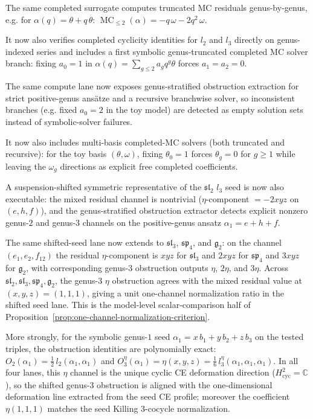   The same completed surrogate computes truncated MC residuals
  genus-by-genus, e.g. for $\alpha(q)=\theta+q\,\theta$:
  $\operatorname{MC}_{\le 2}(\alpha)=-q\,\omega-2q^2\,\omega$.

  It now also verifies completed cyclicity identities for $l_2$ and $l_3$
  directly on genus-indexed series and includes a first symbolic
  genus-truncated completed MC solver branch: fixing $a_0=1$ in
  $\alpha(q)=\sum_{g\le2}a_g q^g\theta$ forces $a_1=a_2=0$.

  The same compute lane now exposes genus-stratified obstruction
  extraction for strict positive-genus ans\"atze and a recursive
  branchwise solver, so inconsistent branches (e.g. fixed $a_0=2$
  in the toy model) are detected as empty solution sets instead of
  symbolic-solver failures.

  It now also includes multi-basis completed-MC solvers
  (both truncated and recursive):
  for the toy basis $(\theta,\omega)$, fixing $\theta_0=1$
  forces $\theta_g=0$ for $g\ge1$ while leaving the $\omega_g$
  directions as explicit free completed coefficients.

  A suspension-shifted symmetric representative of the
  $\mathfrak{sl}_2$ $l_3$ seed is now also executable:
  the mixed residual channel is nontrivial
  ($\eta$-component $=-2xyz$ on $(e,h,f)$), and the
  genus-stratified obstruction extractor detects explicit
  nonzero genus-$2$ and genus-$3$ channels on the positive-genus
  ansatz $\alpha_1=e+h+f$.

  The same shifted-seed lane now extends to
  $\mathfrak{sl}_3$, $\mathfrak{sp}_4$, and $\mathfrak{g}_2$:
  on the channel $(e_1,e_2,f_{12})$ the residual
  $\eta$-component is $xyz$ for $\mathfrak{sl}_3$ and
  $2xyz$ for $\mathfrak{sp}_4$ and $3xyz$ for
  $\mathfrak{g}_2$, with corresponding genus-$3$
  obstruction outputs $\eta$, $2\eta$, and $3\eta$.
  Across $\mathfrak{sl}_2,\mathfrak{sl}_3,\mathfrak{sp}_4,\mathfrak{g}_2$,
  the genus-$3$ $\eta$ obstruction agrees with the mixed
  residual value at $(x,y,z)=(1,1,1)$, giving a unit
  one-channel normalization ratio in the shifted seed lane.
  This is the model-level scalar-comparison half of
  Proposition~\ref{prop:one-channel-normalization-criterion}.

  More strongly, for the symbolic genus-$1$ seed
  $\alpha_1=x\,b_1+y\,b_2+z\,b_3$ on the tested triples, the
  obstruction identities are polynomially exact:
  $O_2(\alpha_1)=\tfrac12\,l_2(\alpha_1,\alpha_1)$ and
  $O_3^\eta(\alpha_1)=\eta(x,y,z)
  =\tfrac16\,l_3^\eta(\alpha_1,\alpha_1,\alpha_1)$.
  In all four lanes, this $\eta$ channel is the unique
  cyclic CE deformation direction
  ($H^2_{\mathrm{cyc}}=\mathbb{C}$), so the shifted
  genus-$3$ obstruction is aligned with the one-dimensional
  deformation line extracted from the seed CE profile; moreover the
  coefficient $\eta(1,1,1)$ matches the seed Killing
  $3$-cocycle normalization.

